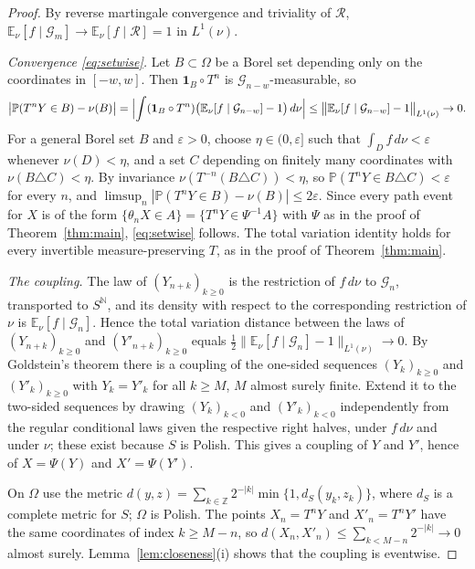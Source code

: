 \documentclass[11pt]{amsart}
\theoremstyle{definition}
\theoremstyle{remark}
\newcommand{\N}{\mathbb N}
\newcommand{\Z}{\mathbb Z}
\newcommand{\E}{\mathbb E}
\newcommand{\Prob}{\mathbb P}
\newcommand{\one}{\mathbf 1}
\begin{document}
\begin{proof}
By reverse martingale convergence and triviality of $\mathcal R$, $\E_\nu[f\mid\mathcal G_m]\to\E_\nu[f\mid\mathcal
R]=1$ in $L^1(\nu)$.

\emph{Convergence \eqref{eq:setwise}.} Let $B\subset\Omega$ be a Borel set depending only on the coordinates in
$[-w,w]$. Then $\one_B\circ T^n$ is $\mathcal G_{n-w}$-measurable, so
\[
\bigl|\Prob(T^nY\in B)-\nu(B)\bigr|=\Bigl|\int(\one_B\circ T^n)\bigl(\E_\nu[f\mid\mathcal G_{n-w}]-1\bigr)\,d\nu\Bigr|
\le\bigl\|\E_\nu[f\mid\mathcal G_{n-w}]-1\bigr\|_{L^1(\nu)}\to0 .
\]
For a general Borel set $B$ and $\varepsilon>0$, choose $\eta\in(0,\varepsilon]$ such that $\int_Df\,d\nu<\varepsilon$
whenever $\nu(D)<\eta$, and a set $C$ depending on finitely many coordinates with $\nu(B\triangle C)<\eta$. By invariance
$\nu(T^{-n}(B\triangle C))<\eta$, so $\Prob(T^nY\in B\triangle C)<\varepsilon$ for every $n$, and
$\limsup_n|\Prob(T^nY\in B)-\nu(B)|\le2\varepsilon$. Since every path event for $X$ is of the form
$\{\theta_nX\in A\}=\{T^nY\in\Psi^{-1}A\}$ with $\Psi$ as in the proof of Theorem~\ref{thm:main}, \eqref{eq:setwise}
follows. The total variation identity holds for every invertible measure-preserving $T$, as in the proof of
Theorem~\ref{thm:main}.

\emph{The coupling.} The law of $(Y_{n+k})_{k\ge0}$ is the restriction of $f\,d\nu$ to $\mathcal G_n$, transported to
$S^\N$, and its density with respect to the corresponding restriction of $\nu$ is $\E_\nu[f\mid\mathcal G_n]$. Hence
the total variation distance between the laws of $(Y_{n+k})_{k\ge0}$ and $(Y'_{n+k})_{k\ge0}$ equals
$\frac12\|\E_\nu[f\mid\mathcal G_n]-1\|_{L^1(\nu)}\to0$. By Goldstein's theorem there is a coupling of the one-sided
sequences $(Y_k)_{k\ge0}$ and $(Y'_k)_{k\ge0}$ with $Y_k=Y'_k$ for all $k\ge M$, $M$ almost surely finite. Extend it to
the two-sided sequences by drawing $(Y_k)_{k<0}$ and $(Y'_k)_{k<0}$ independently from the regular conditional laws
given the respective right halves, under $f\,d\nu$ and under $\nu$; these exist because $S$ is Polish. This gives a
coupling of $Y$ and $Y'$, hence of $X=\Psi(Y)$ and $X'=\Psi(Y')$.

On $\Omega$ use the metric $d(y,z)=\sum_{k\in\Z}2^{-|k|}\min\{1,d_S(y_k,z_k)\}$, where $d_S$ is a complete metric for
$S$; $\Omega$ is Polish. The points $X_n=T^nY$ and $X'_n=T^nY'$ have the same coordinates of index $k\ge M-n$, so
$d(X_n,X'_n)\le\sum_{k<M-n}2^{-|k|}\to0$ almost surely. Lemma~\ref{lem:closeness}(i) shows that the coupling is
eventwise.
\end{proof}
\end{document}
